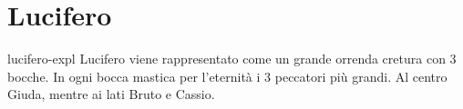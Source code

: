\documentclass[preview]{standalone}
\begin{document}

\section{Lucifero}

\begin{snippet}{lucifero-expl}
    Lucifero viene rappresentato come un grande orrenda cretura con 3 bocche.
    In ogni bocca mastica per l'eternità i 3 peccatori più grandi.
    Al centro Giuda, mentre ai lati Bruto e Cassio.
\end{snippet}
\end{document}
